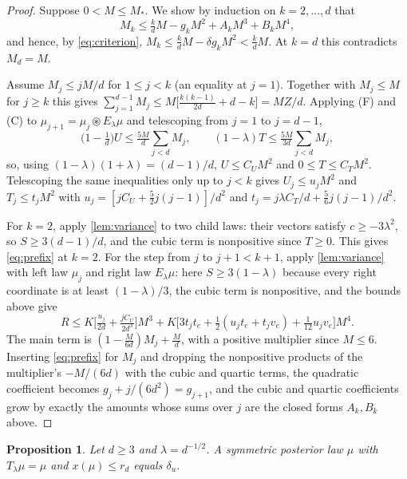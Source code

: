 \documentclass[11pt]{amsart}
\newtheorem{proposition}[theorem]{Proposition}
\theoremstyle{definition}
\theoremstyle{remark}
\begin{document}
\begin{proof}
Suppose $0<M\le M_*$. We show by induction on $k=2,\dots,d$ that
\begin{equation}\label{eq:prefix}
M_k\le\tfrac kdM-g_kM^2+A_kM^3+B_kM^4,
\end{equation}
and hence, by \eqref{eq:criterion}, $M_k\le\tfrac kdM-\delta g_kM^2<\tfrac kdM$. At $k=d$ this contradicts
$M_d=M$.

Assume $M_j\le jM/d$ for $1\le j<k$ (an equality at $j=1$). Together with $M_j\le M$ for $j\ge k$ this gives
$\sum_{j=1}^{d-1}M_j\le M\big[\tfrac{k(k-1)}{2d}+d-k\big]=MZ/d$. Applying (F) and (C) to
$\mu_{j+1}=\mu_j\circledast E_\lambda\mu$ and telescoping from $j=1$ to $j=d-1$,
\[
\big(1-\tfrac1d\big)U\le\tfrac{5M}d\sum_{j<d}M_j,\qquad(1-\lambda)T\le\tfrac{5M}{3d}\sum_{j<d}M_j,
\]
so, using $(1-\lambda)(1+\lambda)=(d-1)/d$, $U\le C_UM^2$ and $0\le T\le C_TM^2$. Telescoping the same
inequalities only up to $j<k$ gives $U_j\le u_jM^2$ and $T_j\le t_jM^2$ with
$u_j=[jC_U+\tfrac52j(j-1)]/d^2$ and $t_j=j\lambda C_T/d+\tfrac56j(j-1)/d^2$.

For $k=2$, apply \cref{lem:variance} to two child laws: their vectors satisfy $c\ge-3\lambda^2$, so
$S\ge3(d-1)/d$, and the cubic term is nonpositive since $T\ge0$. This gives \eqref{eq:prefix} at $k=2$. For the
step from $j$ to $j+1<k+1$, apply \cref{lem:variance} with left law $\mu_j$ and right law $E_\lambda\mu$: here
$S\ge3(1-\lambda)$ because every right coordinate is at least $(1-\lambda)/3$, the cubic term is nonpositive, and
the bounds above give
\[
R\le K\Big[\tfrac{u_j}{2d}+\tfrac{jC_U}{2d^3}\Big]M^3+K\Big[3t_jt_e+\tfrac12(u_jt_e+t_jv_e)+\tfrac1{12}u_jv_e\Big]M^4 .
\]
The main term is $(1-\tfrac M{6d})M_j+\tfrac Md$, with a positive multiplier since $M\le6$. Inserting
\eqref{eq:prefix} for $M_j$ and dropping the nonpositive products of the multiplier's $-M/(6d)$ with the cubic and
quartic terms, the quadratic coefficient becomes $g_j+j/(6d^2)=g_{j+1}$, and the cubic and quartic coefficients
grow by exactly the amounts whose sums over $j$ are the closed forms $A_k,B_k$ above.
\end{proof}

\begin{proposition}\label{prop:local3}
Let $d\ge3$ and $\lambda=d^{-1/2}$. A symmetric posterior law $\mu$ with $T_\lambda\mu=\mu$ and $x(\mu)\le r_d$
equals $\delta_u$.
\end{proposition}
\end{document}
